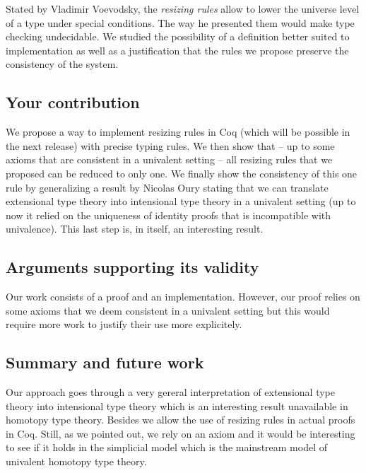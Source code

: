 \documentclass[11pt]{article}
\theoremstyle{plain}
\theoremstyle{remark}
\begin{document}
Stated by Vladimir Voevodsky, the \emph{resizing rules} allow to lower the
universe level of a type under special conditions. The way he presented them
would make type checking undecidable.
We studied the possibility of a definition better suited to implementation
as well as a justification that the rules we propose preserve the consistency
of the system.

\subsection*{Your contribution}

We propose a way to implement resizing rules in Coq (which will be possible in
the next release) with precise typing rules.
We then show that -- up to some axioms that are consistent in a univalent
setting -- all resizing rules that we proposed %
can be reduced to only one.
We finally show the consistency of this one rule by generalizing a result by
Nicolas Oury stating that we can translate extensional type theory into
intensional type theory in a univalent setting (up to now it relied on the
uniqueness of identity proofs that is incompatible with univalence).
This last step is, in itself, an interesting result.

\subsection*{Arguments supporting its validity}

Our work consists of a proof and an implementation.
However, our proof relies on some axioms that we deem consistent in a univalent
setting but this would require more work to justify their use more explicitely.


\subsection*{Summary and future work}

Our approach goes through a very gereral interpretation of extensional type
theory into intensional type theory which is an interesting result unavailable
in homotopy type theory. Besides we allow the use of resizing rules in actual
proofs in Coq.
Still, as we pointed out, we rely on an axiom and it would be interesting to
see if it holds in the simplicial model which is the mainstream model of
univalent homotopy type theory.
\end{document}
